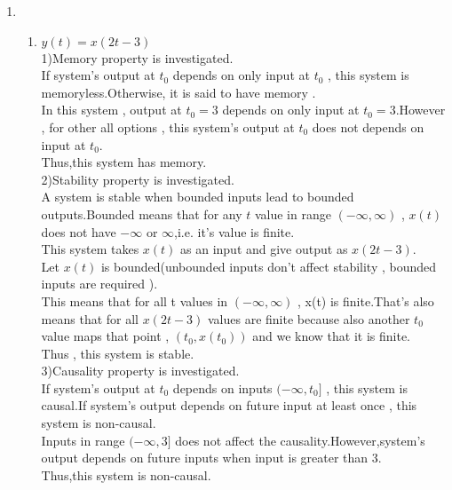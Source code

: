 \documentclass[10pt,a4paper, margin=1in]{article}
\begin{document}
\begin{enumerate}
\item 
    \begin{enumerate}
    \item %
    
    $y(t) = x(2t-3)$ \\
    
    1)Memory property is investigated.\\
    
    If system's output at $t_0$ depends on only input at $t_0$ , this system is memoryless.Otherwise, it is said to have memory .\\
    In this system , output at $t_0 = 3 $ depends on only input at $t_0 = 3 $.However , for other all options , this system's output at $t_0 $ does not depends on input at $t_0 $.\\ 
    Thus,this system has memory.\\
 
 	2)Stability property is investigated.\\
 	
 	A system is stable when bounded inputs lead to bounded outputs.Bounded means that for any $t$ value in range $(-\infty , \infty)$ , $x(t)$ does not have $-\infty$ or $\infty$,i.e. it's value is finite.\\
 	
 	This system takes $x(t)$ as an input and give output as $x(2t-3)$.\\
 	
 	Let $x(t)$ is bounded(unbounded inputs don't affect stability , bounded inputs are required ).\\This means that for all t values in $(-\infty , \infty)$ , x(t) is finite.That's also means that for all $x(2t-3)$ values are finite because also another $t_0$ value maps that point , $(t_0 , x(t_0))$ and we know that it is finite.\\
 	
 	Thus , this system is stable.\\ 
 	
 	3)Causality property is investigated.\\
 	
 	If system's output at $t_0$ depends on inputs $(-\infty ,t_0]$ , this system is causal.If system's output depends on future input at least once , this system is non-causal.\\
 	Inputs in range $(-\infty,3]$ does not affect the causality.However,system's output depends on future inputs when input is greater than 3.\\
 	Thus,this system is non-causal.\\
 	

\end{enumerate}
\end{enumerate}
\end{document}
